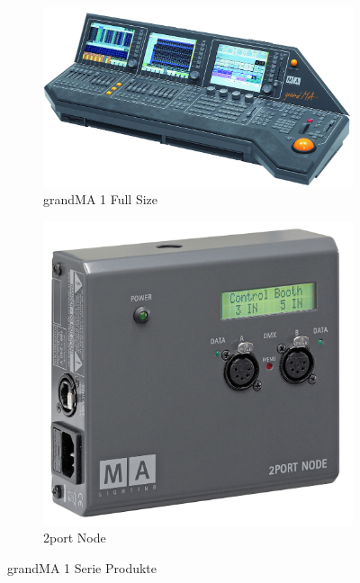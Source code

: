 \documentclass[11pt]{scrartcl}
\begin{document}
\begin{figure}[H]
    \centering
    \begin{subfigure}[b]{0.45\textwidth}
        \includegraphics[width=\textwidth]{images/grandMA_1.png}
        \caption{grandMA 1 Full Size}
    \end{subfigure}
    \hfill 
    \begin{subfigure}[b]{0.25\textwidth}
        \includegraphics[width=\textwidth]{images/MA_2Port_Node_onPC_13019x.png}
        \caption{2port Node}
    \end{subfigure}
    \caption{grandMA 1 Serie Produkte}\label{fig:gma1}
\end{figure}
\end{document}
